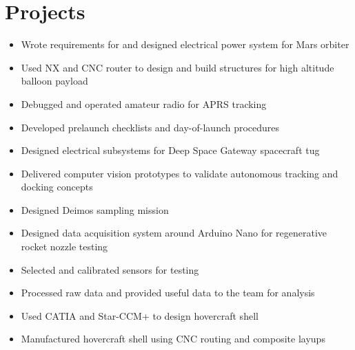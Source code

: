 \documentclass{resume}
\begin{document}
\section{Projects}
\begin{itemize}
    \item Wrote requirements for and designed electrical power system for Mars orbiter
\end{itemize}
\begin{itemize}
    \item Used NX and CNC router to design and build structures for high altitude balloon payload
    \item Debugged and operated amateur radio for APRS tracking
    \item Developed prelaunch checklists and day-of-launch procedures
\end{itemize}
\begin{itemize}
    \item Designed electrical subsystems for Deep Space Gateway spacecraft tug
    \item Delivered computer vision prototypes to validate autonomous tracking and docking concepts
\end{itemize}
\begin{itemize}
    \item Designed Deimos sampling mission
\end{itemize}
\begin{itemize}
    \item Designed data acquisition system around Arduino Nano for regenerative rocket nozzle testing
    \item Selected and calibrated sensors for testing
    \item Processed raw data and provided useful data to the team for analysis
\end{itemize}
\begin{itemize}
    \item Used CATIA and Star-CCM+ to design hovercraft shell
    \item Manufactured hovercraft shell using CNC routing and composite layups
\end{itemize}
\end{document}
